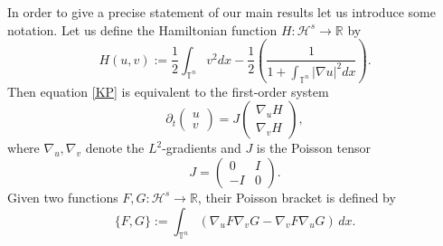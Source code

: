 \documentclass[reqno,11pt]{amsart}
\theoremstyle{plain}
\numberwithin{equation}{section}
\newcommand{\R}{\mathbb{R}}
\newcommand{\T}{\mathbb{T}}
\newcommand{\dt}{\partial_t}
\begin{document}
In order to give a precise statement of our main results let us introduce some notation.
Let us define the Hamiltonian function $H : {\mathcal H}^s \to \R$ by
\begin{equation}\label{hamiltonian1int}
	H(u,v):=\frac{1}{2}\int_{\T^n}v^2dx-\frac{1}{2}\left(\dfrac{1}{1+\int_{\T^n}\left|\nabla u\right|^2dx}\right).
\end{equation}
Then equation \eqref{KP} is equivalent to the first-order system
\begin{equation}\label{sysJ}
	\dt\begin{pmatrix}
		u\\
		v
	\end{pmatrix}=J
	\begin{pmatrix}
		\nabla_u H\\
		\nabla_v H
	\end{pmatrix},
\end{equation}
where $\nabla_u, \nabla_v$ denote the $L^2$-gradients and $J$ is the Poisson tensor
\begin{equation}\label{J}
	J=\begin{pmatrix}
		0&I\\
		-I&0
	\end{pmatrix}.
\end{equation}
Given two functions $F,G : {\mathcal H}^s \to \R$, their Poisson bracket is defined by
\begin{equation}\label{def Poisson}
	\{F,G\}:= \int_{\T^n} \left( \nabla_u F \nabla_v G - \nabla_v F \nabla_u G \right)\,dx.
\end{equation}
\end{document}
